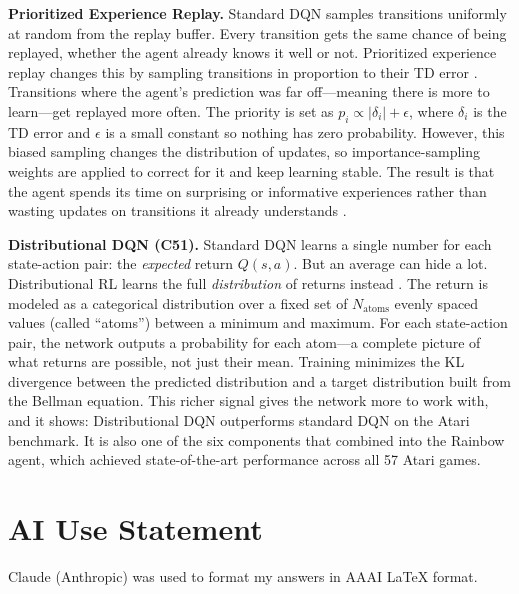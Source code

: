 \documentclass[letterpaper]{article}
\begin{document}
\vspace{0.5em}

\textbf{Prioritized Experience Replay.} Standard DQN samples transitions uniformly at random from the replay buffer. Every transition gets the same chance of being replayed, whether the agent already knows it well or not. Prioritized experience replay changes this by sampling transitions in proportion to their TD error \citep{schaul2016prioritized}. Transitions where the agent's prediction was far off---meaning there is more to learn---get replayed more often. The priority is set as $p_i \propto |\delta_i| + \epsilon$, where $\delta_i$ is the TD error and $\epsilon$ is a small constant so nothing has zero probability. However, this biased sampling changes the distribution of updates, so importance-sampling weights are applied to correct for it and keep learning stable. The result is that the agent spends its time on surprising or informative experiences rather than wasting updates on transitions it already understands \citep{hessel2018rainbow}.

\textbf{Distributional DQN (C51).} Standard DQN learns a single number for each state-action pair: the \textit{expected} return $Q(s,a)$. But an average can hide a lot. Distributional RL learns the full \textit{distribution} of returns instead \citep{bellemare2017distributional}. The return is modeled as a categorical distribution over a fixed set of $N_{\text{atoms}}$ evenly spaced values (called ``atoms'') between a minimum and maximum. For each state-action pair, the network outputs a probability for each atom---a complete picture of what returns are possible, not just their mean. Training minimizes the KL divergence between the predicted distribution and a target distribution built from the Bellman equation. This richer signal gives the network more to work with, and it shows: Distributional DQN outperforms standard DQN on the Atari benchmark. It is also one of the six components that \citet{hessel2018rainbow} combined into the Rainbow agent, which achieved state-of-the-art performance across all 57 Atari games.

\section*{AI Use Statement}

Claude (Anthropic) was used to format my answers in AAAI LaTeX format.


\end{document}
